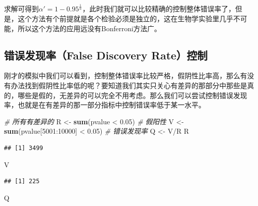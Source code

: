 \documentclass[]{tufte-book}
\newenvironment{Shaded}{}{}
\newcommand{\CommentTok}[1]{\textcolor[rgb]{0.38,0.63,0.69}{\textit{#1}}}
\newcommand{\DecValTok}[1]{\textcolor[rgb]{0.25,0.63,0.44}{#1}}
\newcommand{\FloatTok}[1]{\textcolor[rgb]{0.25,0.63,0.44}{#1}}
\newcommand{\KeywordTok}[1]{\textcolor[rgb]{0.00,0.44,0.13}{\textbf{#1}}}
\newcommand{\NormalTok}[1]{#1}
\newcommand{\OperatorTok}[1]{\textcolor[rgb]{0.40,0.40,0.40}{#1}}
\newcommand{\StringTok}[1]{\textcolor[rgb]{0.25,0.44,0.63}{#1}}
\begin{document}
求解可得到\(\alpha' = 1-0.95^{\frac{1}{n}}\)，此时我们就可以比较精确的控制整体错误率了，但是，这个方法有个前提就是各个检验必须是独立的，这在生物学实验里几乎不可能，所以这个方法的应用远没有Bonferroni方法广。

\hypertarget{ux9519ux8befux53d1ux73b0ux7387false-discovery-rateux63a7ux5236}{%
\subsection{错误发现率（False Discovery Rate）控制}\label{ux9519ux8befux53d1ux73b0ux7387false-discovery-rateux63a7ux5236}}

刚才的模拟中我们可以看到，控制整体错误率比较严格，假阴性比率高，那么有没有办法找到假阴性比率低的呢？要知道我们其实只关心有差异的那部分中那些是真的，哪些是假的，无差异的可以完全不用考虑。那么我们可以尝试控制错误发现率，也就是在有差异的那一部分指标中控制错误率低于某一水平。

\begin{Shaded}
\begin{Highlighting}[]
\CommentTok{# 所有有差异的}
\NormalTok{R <-}\StringTok{ }\KeywordTok{sum}\NormalTok{(pvalue }\OperatorTok{<}\StringTok{ }\FloatTok{0.05}\NormalTok{)}
\CommentTok{# 假阳性}
\NormalTok{V <-}\StringTok{ }\KeywordTok{sum}\NormalTok{(pvalue[}\DecValTok{5001}\OperatorTok{:}\DecValTok{10000}\NormalTok{] }\OperatorTok{<}\StringTok{ }\FloatTok{0.05}\NormalTok{)}
\CommentTok{# 错误发现率}
\NormalTok{Q <-}\StringTok{ }\NormalTok{V}\OperatorTok{/}\NormalTok{R}
\NormalTok{R}
\end{Highlighting}
\end{Shaded}

\begin{verbatim}
## [1] 3499
\end{verbatim}

\begin{Shaded}
\begin{Highlighting}[]
\NormalTok{V}
\end{Highlighting}
\end{Shaded}

\begin{verbatim}
## [1] 225
\end{verbatim}

\begin{Shaded}
\begin{Highlighting}[]
\NormalTok{Q}
\end{Highlighting}
\end{Shaded}
\end{document}
